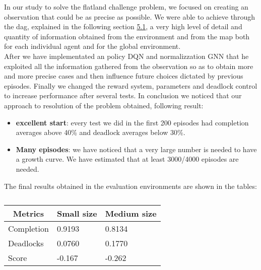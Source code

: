 In our study to solve the flatland challenge problem, we focused on creating an observation that could be as precise as possible. We were able to achieve through the dag, explained in the following section \hyperref[sec:dagObserv]{5.1}, a very high level of detail and quantity of information obtained from the environment and from the map both for each individual agent and for the global environment. \\
After we have implementated an policy DQN and normalizzation GNN that he exploited all the information gathered from the observation so as to obtain more and more precise cases and then influence future choices dictated by previous episodes. 
Finally we changed the reward system, parameters and deadlock control to increase performance after several tests.
In conclusion we noticed that our approach to resolution of the problem obtained, following result:
\begin{itemize}
	\item \textbf{excellent start}: every test we did in the first 200 episodes had completion averages above 40\% and deadlock averages below 30\%.
	\item \textbf{Many episodes}: we have noticed that a very large number is needed to have a growth curve. We have estimated that at least 3000/4000 episodes are needed.
\end{itemize}
The final results obtained in the evaluation environments are shown in the tables:

\begin{table}[htb]
	\centering
	\bgroup
	\def\arraystretch{1.5}%
	\begin{tabular}{|l|l|l|}
		\hline
		\multicolumn{1}{|c|}{Metrics}                         & \multicolumn{1}{c|}{Small size} & \multicolumn{1}{c|}{Medium size}                          \\ \hline
		Completion                        & 0.9193    & 0.8134    \\ \hline
		Deadlocks                         & 0.0760    & 0.1770    \\ \hline
		Score                             & -0.167    & -0.262     \\ \hline
	\end{tabular}
	\egroup
	\caption{}
	\label{tab:evaluation1}
\end{table}
